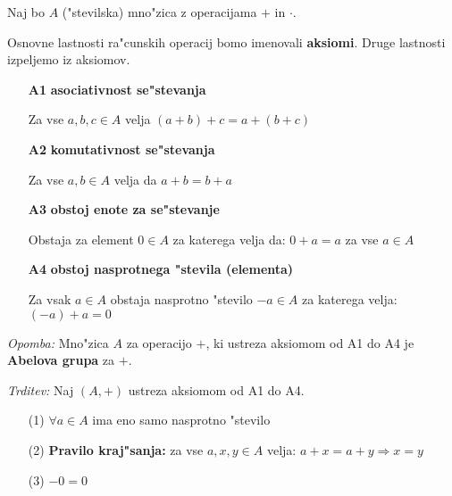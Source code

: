 Naj bo \(A\) ("stevilska) mno"zica z operacijama \(+\) in \(\cdot\).

Osnovne lastnosti ra"cunskih operacij bomo imenovali \textbf{aksiomi}. Druge lastnosti izpeljemo iz aksiomov.
\begin{itemize}
	\item[\textbf{A1}] \textbf{asociativnost se"stevanja}

	Za vse \(a, b, c \in A\) velja \((a + b) + c = a + (b + c)\)
	\item[\textbf{A2}] \textbf{komutativnost se"stevanja}
	
	Za vse \(a, b \in A\) velja da \(a + b = b + a\)
	
	\item[\textbf{A3}] \textbf{obstoj enote za se"stevanje}
	
	Obstaja za element \(0 \in A\) za katerega velja da: \(0 + a = a\) za vse \(a \in A\)
	
	\item[\textbf{A4}] \textbf{obstoj nasprotnega "stevila (elementa)}
	
	Za vsak \(a \in A\) obstaja nasprotno "stevilo \(-a \in A\) za katerega velja: \((-a) + a = 0\)
\end{itemize}

\emph{Opomba:} Mno"zica \(A\) za operacijo \(+\), ki ustreza aksiomom od A1 do A4 je \textbf{Abelova grupa} za \(+\).

\emph{Trditev:} Naj \((A, +)\) ustreza aksiomom od A1 do A4.
\begin{itemize}
	\item[(1)] \(\forall a \in A \) ima eno samo nasprotno "stevilo
	\item[(2)] \textbf{Pravilo kraj"sanja:} za vse \(a, x, y \in A\) velja: \(a + x = a + y \Rightarrow x = y\)
	\item[(3)] \(-0 = 0\)
\end{itemize}

